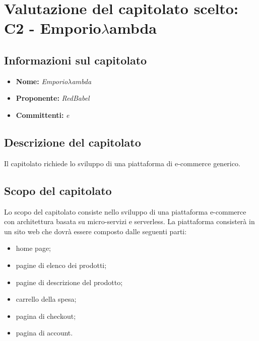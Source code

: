 \section{Valutazione del capitolato scelto: C2 - Emporio$\lambda$ambda}
\subsection{Informazioni sul capitolato}
\begin{itemize}
	\item \textbf{Nome:} \textit{Emporio$\lambda$ambda}
	\item \textbf{Proponente:} \textit{RedBabel}
	\item \textbf{Committenti:} \textit{\VT{} e \CR{}}
\end{itemize}

\subsection{Descrizione del capitolato}
Il capitolato richiede lo sviluppo di una piattaforma di e-commerce generico.

\subsection{Scopo del capitolato}
Lo scopo del capitolato consiste nello sviluppo di una piattaforma e-commerce con architettura basata su micro-servizi e serverless.
La piattaforma consisterà in un sito web che dovrà essere composto dalle seguenti parti:
\begin{itemize}
	\item home page;
	\item pagine di elenco dei prodotti;
	\item pagine di descrizione del prodotto;
	\item carrello della spesa;
	\item pagina di checkout;
	\item pagina di account.
\end{itemize}

